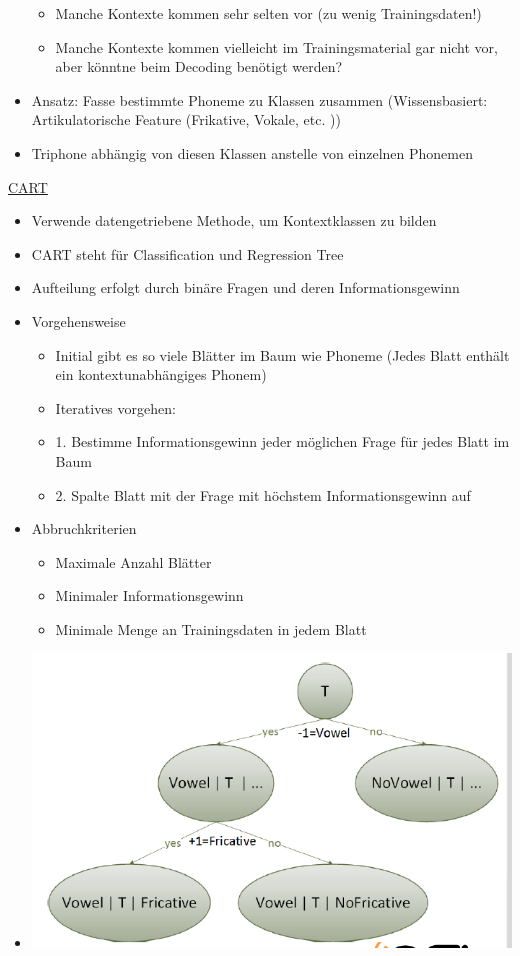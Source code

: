 \documentclass[a4paper,10pt,oneside]{article}
\begin{document}
\begin{itemize}
			\begin{itemize}
				\item Manche Kontexte kommen sehr selten vor (zu wenig Trainingsdaten!)
				\item Manche Kontexte kommen vielleicht im Trainingsmaterial gar nicht vor, aber könntne beim Decoding benötigt werden?
			\end{itemize}
		\item Ansatz: Fasse bestimmte Phoneme zu Klassen zusammen (Wissensbasiert: Artikulatorische Feature (Frikative, Vokale, etc. ))
		\item Triphone abhängig von diesen Klassen anstelle von einzelnen Phonemen
	\end{itemize}

\underline{CART} \\
	\begin{itemize}
		\item Verwende datengetriebene Methode, um Kontextklassen zu bilden
		\item CART steht für Classification und Regression Tree
		\item Aufteilung erfolgt durch binäre Fragen und deren Informationsgewinn
		\item Vorgehensweise
			\begin{itemize}
				\item Initial gibt es so viele Blätter im Baum wie Phoneme (Jedes Blatt enthält ein kontextunabhängiges Phonem)
				\item Iteratives vorgehen:
				\item 1. Bestimme Informationsgewinn jeder möglichen Frage für jedes Blatt im Baum
				\item 2. Spalte Blatt mit der Frage mit höchstem Informationsgewinn auf
			\end{itemize}
		\item Abbruchkriterien
			\begin{itemize}
				\item Maximale Anzahl Blätter
				\item Minimaler Informationsgewinn
				\item Minimale Menge an Trainingsdaten in jedem Blatt
			\end{itemize}
		\item[] \includegraphics[scale=0.2]{Grafiken/1345.png}
	\end{itemize}
\end{document}
